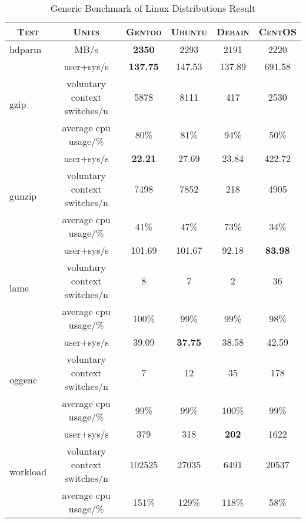 \begin{table}[ht]
  \centering
  \caption{Generic Benchmark of Linux Distributions Result}
  \label{tab:os_generic_benchmark}
  
  \begin{tabular}{l|c|c|c|c|c}

    \multicolumn{1}{c|}{\textbf{\textsc{Test}}} & \textbf{\textsc{Units}} & \textbf{\textsc{Gentoo}} & \textbf{\textsc{Ubuntu}} & \textbf{\textsc{Debain}} & \textbf{\textsc{CentOS}} \\ \hline
    hdparm & MB/s & \textbf{2350} & 2293 & 2191 & 2220 \\ \hline

    \multirow{3}{*}{gzip} & user+sys/s & \textbf{137.75} & 147.53 & 137.89 & 691.58 \\ \cline{2-6}
    & voluntary context switches/n & 5878 & 8111 & 417 & 2530 \\ \cline{2-6}
    & average cpu usage/\% & 80\% & 81\% & 94\% & 50\% \\ \hline

    \multirow{3}{*}{gunzip} & user+sys/s & \textbf{22.21} & 27.69 & 23.84 & 422.72 \\ \cline{2-6}
    & voluntary context switches/n & 7498 & 7852 & 218 & 4905 \\ \cline{2-6}
    & average cpu usage/\% & 41\% & 47\% & 73\% & 34\% \\ \hline

    \multirow{3}{*}{lame} & user+sys/s & 101.69 & 101.67 & 92.18 & \textbf{83.98} \\ \cline{2-6}
    & voluntary context switches/n & 8 & 7 & 2 & 36 \\ \cline{2-6}
    & average cpu usage/\% & 100\% & 99\% & 99\% & 98\% \\ \hline

    \multirow{3}{*}{oggenc} & user+sys/s & 39.09 & \textbf{37.75} & 38.58 & 42.59 \\ \cline{2-6}
    & voluntary context switches/n & 7 & 12 & 35 & 178 \\ \cline{2-6}
    & average cpu usage/\% & 99\% & 99\% & 100\% & 99\% \\ \hline

    \multirow{3}{*}{workload} & user+sys/s & 379 & 318 & \textbf{202} & 1622 \\ \cline{2-6}
    & voluntary context switches/n & 102525 & 27035 & 6491 & 20537 \\ \cline{2-6}
    & average cpu usage/\% & 151\% & 129\% & 118\% & 58\% \\
  \end{tabular}
\end{table}

